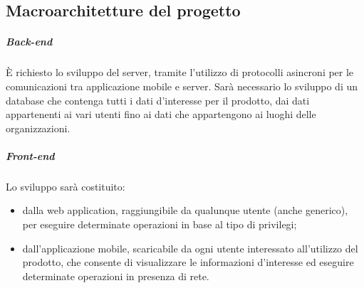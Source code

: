\documentclass[../analisi-dei-requisiti.tex]{subfiles}
\begin{document}
\subsection{Macroarchitetture del progetto}%
\label{sub:macroarchitetture_del_progetto}
\subparagraph*{Back-end}%
\label{par:back-end}
È richiesto lo sviluppo  del server, tramite l'utilizzo di protocolli asincroni per le comunicazioni tra applicazione mobile e server. Sarà necessario lo sviluppo di un database che contenga tutti i dati d'interesse per il prodotto, dai dati appartenenti ai vari utenti fino ai dati che appartengono ai luoghi delle organizzazioni.

\subparagraph*{Front-end}%
\label{par:front-end}
Lo sviluppo  sarà costituito:
\begin{itemize}
  \item dalla web application, raggiungibile da qualunque utente (anche generico), per eseguire determinate operazioni in base al tipo di privilegi;
  \item dall'applicazione mobile, scaricabile da ogni utente interessato all'utilizzo del prodotto, che consente di visualizzare le informazioni d'interesse ed eseguire determinate operazioni in presenza di rete.
\end{itemize}
\end{document}

